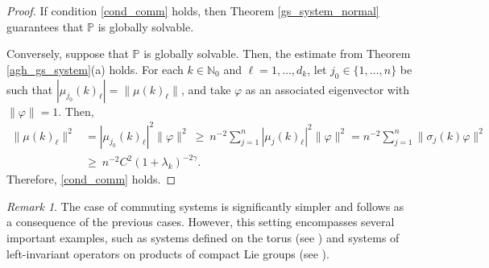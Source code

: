 \documentclass{amsart}
\theoremstyle{definition}
\theoremstyle{remark}
\newtheorem{remark}[theorem]{Remark}
\numberwithin{equation}{section}
\begin{document}
	\begin{proof}
		If condition \eqref{cond_comm} holds, then Theorem \ref{gs_system_normal} guarantees that $\mathbb{P}$ is globally solvable.
		
		Conversely, suppose that $\mathbb{P}$ is globally solvable. Then, the estimate from Theorem \ref{agh_gs_system}(a) holds. For each \( k\in\mathbb{N}_0 \) and \( \ell=1,\dots,d_k \), let \( j_0\in\{1,\dots,n\} \) be such that $|\mu_{j_0}(k)_\ell|=\|\mu(k)_\ell\|$,
		and take \( \varphi \) as an associated eigenvector with \( \|\varphi\|=1 \). Then,
		\begin{align*}
			\|\mu(k)_\ell\|^2 &= |\mu_{j_0}(k)_\ell|^2\|\varphi\|^2\ \geq\ n^{-2}\sum_{j=1}^n|\mu_j(k)_\ell|^2\|\varphi\|^2  = n^{-2}\sum_{j=1}^n\|\sigma_j(k)\varphi\|^2\\
			& \geq\ n^{-2}C^{2}(1+\lambda_k)^{-2\gamma}.
		\end{align*}
		Therefore, \eqref{cond_comm} holds.
	\end{proof}
	
\begin{remark}
	The case of commuting systems is significantly simpler and follows as a consequence of the previous cases. However, this setting encompasses several important examples, such as systems defined on the torus (see \cite{AKM19,AM2021,Be1999,BP1999_jmaa}) and systems of left-invariant operators on products of compact Lie groups (see \cite{DKP2024arxiv}).
\end{remark}



	
\end{document}
